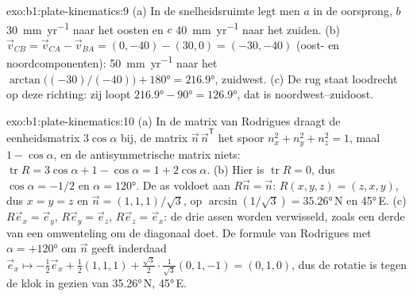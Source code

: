\begin{solution}{exo:b1:plate-kinematics:9}
(a) In de snelheidsruimte legt men $a$ in de oorsprong, $b$ \qty{30}{mm.yr^{-1}} naar het oosten en $c$ \qty{40}{mm.yr^{-1}} naar het zuiden. (b) $\vec v_{CB} =
\vec v_{CA} - \vec v_{BA} = (0, -40) - (30, 0) = (-30, -40)$ (oost- en noordcomponenten): \qty{50}{mm.yr^{-1}} naar het 
$\arctan\bigl((-30)/(-40)\bigr) + \ang{180} = \ang{216.9}$, zuidwest. (c) De rug staat loodrecht op deze richting: zij loopt
$\ang{216.9} - \ang{90} = \ang{126.9}$, dat is noordwest--zuidoost.
\end{solution}

\begin{solution}{exo:b1:plate-kinematics:10}
(a) In de matrix van Rodrigues draagt de eenheidsmatrix $3\cos\alpha$ bij, de matrix
$\vec n\,\vec n^{\mathsf T}$ het spoor $n_x^2 + n_y^2 + n_z^2 = 1$, maal
$1 - \cos\alpha$, en de antisymmetrische matrix niets: $\operatorname{tr}R =
3\cos\alpha + 1 - \cos\alpha = 1 + 2\cos\alpha$. (b) Hier is $\operatorname{tr}R = 0$,
dus $\cos\alpha = -1/2$ en $\alpha = \ang{120}$. De as voldoet aan $R\vec n =
\vec n$: $R(x, y, z) = (z, x, y)$, dus $x = y = z$ en $\vec n =
(1, 1, 1)/\sqrt3$, op  $\arcsin(1/\sqrt3) = \ang{35.26}$\,N en
 \ang{45}\,E. (c) $R\vec e_x = \vec e_y$, $R\vec e_y = \vec e_z$,
$R\vec e_z = \vec e_x$: de drie assen worden verwisseld, zoals een derde van een omwenteling om de diagonaal doet. De formule van Rodrigues met $\alpha = +\ang{120}$ om $\vec n$ geeft inderdaad $\vec e_x\mapsto -\tfrac12\vec e_x + \tfrac12(1, 1, 1) +
\tfrac{\sqrt3}{2}\cdot\tfrac{1}{\sqrt3}(0, 1, -1) = (0, 1, 0)$, dus de rotatie is tegen de klok in gezien van \ang{35.26}\,N, \ang{45}\,E.
\end{solution}

